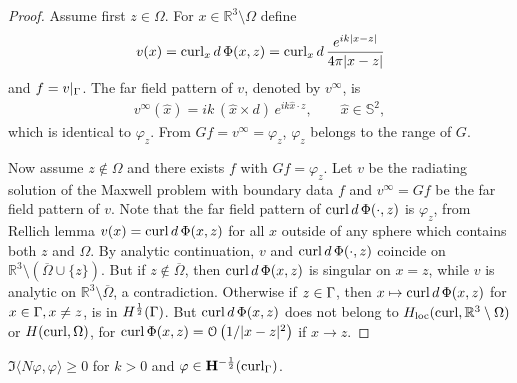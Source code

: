\begin{proof}
  Assume first $z\in\Omega$. For $x\in\mathbb{R}^3\setminus\Omega$ define
  \begin{align*}
    v(x)=\operatorname{curl}_x d\,\Phi(x, z)=\operatorname{curl}_x d\,\frac{e^{ik|x-z|}}{4\pi|x-z|}
  \end{align*}
  and $f=v|_\Gamma$. The far field pattern of $v$, denoted by $v^\infty$, is 
  \begin{align*}
    v^\infty(\hat{x}) = ik\,(\hat{x}\times d)\,e^{ik\hat{x}\cdot z},\qquad\hat{x}\in\mathbb{S}^2,
  \end{align*}
  which is identical to $\varphi_z$. From $Gf=v^\infty=\varphi_z$, $\varphi_z$ belongs to the range of $G$.  
  
  Now assume $z\not\in\Omega$ and there exists $f$ with $Gf=\varphi_z$. Let $v$ be the radiating solution of the Maxwell problem with boundary data $f$ and $v^\infty=Gf$ be the far field pattern of $v$. Note that the far field pattern of $\operatorname{curl} d\,\Phi(\cdot, z)$ is $\varphi_z$, from Rellich lemma $v(x)=\operatorname{curl} d\,\Phi(x, z)$ for all $x$ outside of any sphere which contains both $z$ and $\Omega$. By analytic continuation, $v$ and $\operatorname{curl} d\,\Phi(\cdot, z)$ coincide on $\mathbb{R}^3\setminus(\overline{\Omega}\cup\{z\})$. But if $z\not\in\overline{\Omega}$, then $\operatorname{curl} d\,\Phi(x, z)$ is singular on $x=z$, while $v$ is analytic on $\mathbb{R}^3\setminus\overline{\Omega}$, a contradiction. Otherwise if $z\in\Gamma$, then $x\mapsto\operatorname{curl} d\,\Phi(x, z)$ for $x\in\Gamma, x\neq z$, is in $H^{\frac{1}{2}}(\Gamma)$. But $\operatorname{curl} d\,\Phi(x, z)$ does not belong to $H_\text{loc}(\operatorname{curl}, \mathbb{R}^3\setminus\Omega)$ or $H(\operatorname{curl}, \Omega)$, for $\operatorname{curl}\Phi(x, z)=\mathcal{O}\left(1/|x-z|^2\right)$ if $x\to z$.

\end{proof}

\begin{prp}
  $\Im\langle N\varphi, \varphi\rangle\geqslant 0$ for $k>0$ and $\varphi\in{\bf H}^{-\frac{1}{2}}(\operatorname{curl}_\Gamma)$. 
\end{prp}

